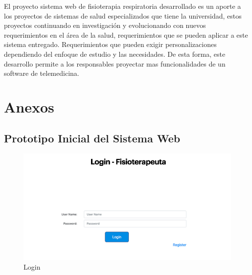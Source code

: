 \documentclass[12pt]{article}
\begin{document}
El proyecto sistema web de fisioterapia respiratoria desarrollado es un aporte a los proyectos de sistemas de salud especializados que tiene la universidad, estos proyectos continuando en investigación y evolucionando con nuevos requerimientos en el área de la salud, requerimientos que se pueden aplicar a este sistema entregado. Requerimientos que pueden exigir personalizaciones dependiendo del enfoque de estudio y las necesidades. De esta forma, este desarrollo permite a los responsables proyectar mas funcionalidades de un software de telemedicina.




\newpage





\nocite{1}
\nocite{2}
\nocite{3}
\nocite{4}
\nocite{5}




\section{Anexos}
\subsection{Prototipo Inicial del Sistema Web} 


\begin{figure}[ht]
\centering
\includegraphics[scale=0.4]{imag/P1.png}
\caption{Login }
\label{6}
\end{figure}
\FloatBarrier
\end{document}
